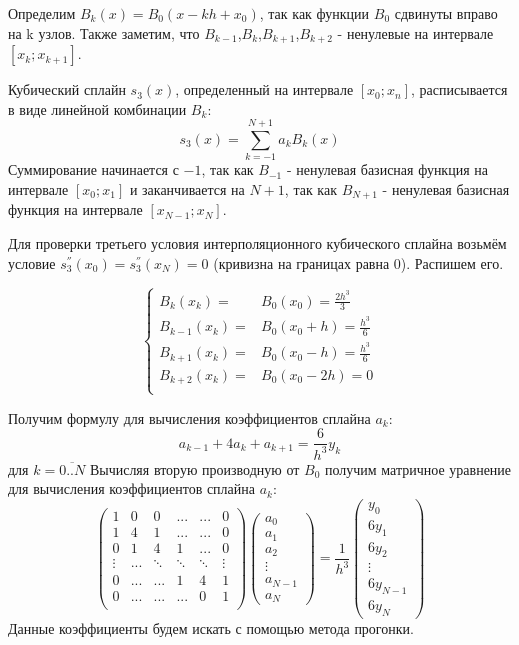 \documentclass [12pt]{article}
\begin{document}
Определим $B_k(x)=B_0(x-kh+x_0)$, так как функции $B_0$ сдвинуты вправо на k узлов. Также заметим, что $B_{k-1}$,$B_{k}$,$B_{k+1}$,$B_{k+2}$ - ненулевые на интервале $[x_{k};x_{k+1}]$.

Кубический сплайн $s_{3}(x)$, определенный на интервале $[x_0;x_n]$, расписывается в виде линейной комбинации $B_k$:
$$s_{3}(x) = \sum_{k=-1}^{N+1} a_kB_k(x) $$
Суммирование начинается с $-1$, так как $B_{-1}$ - ненулевая базисная функция на интервале $[x_0;x_1]$ и заканчивается на $N+1$, так как $B_{N+1}$ - ненулевая базисная функция на интервале $[x_{N-1};x_N]$.

Для проверки третьего условия интерполяционного кубического сплайна возьмём условие $s_3^{''}(x_0)=s_3^{''}(x_N)=0$ (кривизна на границах равна 0).
Распишем его. 

\begin{equation*}
\begin{cases}
B_{k}(x_k) = &B_{0}(x_0) = \frac{2h^3}{3}\\
B_{k-1}(x_k) = & B_{0}(x_0+h) = \frac{h^3}{6} \\
B_{k+1}(x_k) = & B_{0}(x_0-h) = \frac{h^3}{6} \\
B_{k+2}(x_k) = & B_{0}(x_0-2h)  = 0 \\
\end{cases}
\end{equation*}

Получим формулу для вычисления коэффициентов сплайна $a_k$:
$$a_{k-1}+4a_{k}+a_{k+1}=\frac{6}{h^3} y_k$$ для $k=\overline{0..N}$
Вычисляя вторую производную от $B_0$ получим матричное уравнение для вычисления коэффициентов сплайна $a_k$:
$$\left(\begin{array}{cccccc} 
1 & 0 & 0 & ... & ... &  0 \\
1 & 4 & 1 & ... & ... &  0 \\
0 & 1 & 4 & 1 & ... &  0 \\
\vdots & ... & \ddots & \ddots & \ddots &  \vdots \\
0 & ... & ... & 1 & 4 & 1 \\
0 & ... & ... & ... & 0 & 1\\
\end{array}\right) 
\left(\begin{array}{c} 
a_0 \\
a_1 \\
a_2 \\
\vdots \\
a_{N-1} \\
a_{N} \end{array}\right) =
\frac{1}{h^3} \left(\begin{array}{c} 
y_0 \\
6y_1 \\
6y_2 \\
\vdots \\
6y_{N-1} \\
6y_{N} \end{array}\right)   $$
Данные коэффициенты будем искать с помощью метода прогонки.
\end{document}
